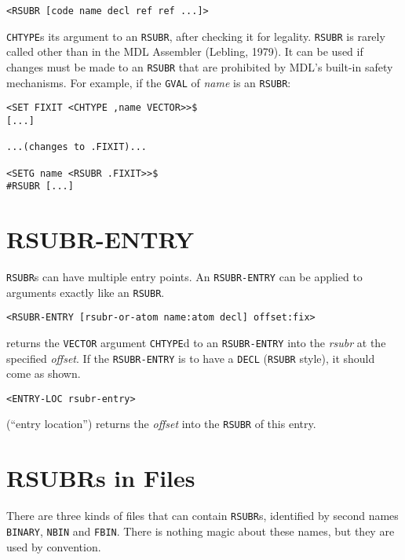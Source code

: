 \documentclass[a4paper]{scrbook}
\begin{document}
\begin{verbatim}
<RSUBR [code name decl ref ref ...]>
\end{verbatim}

 \texttt{CHTYPE}s its argument to an \texttt{RSUBR}, after checking it for legality.
\texttt{RSUBR} is rarely called other than in the MDL Assembler (Lebling, 1979). It can be used if changes must be made to
an \texttt{RSUBR} that are prohibited by MDL's built-in safety mechanisms. For example, if the \texttt{GVAL} of \emph{name}
is an \texttt{RSUBR}:

\begin{verbatim}
<SET FIXIT <CHTYPE ,name VECTOR>>$
[...]

...(changes to .FIXIT)...

<SETG name <RSUBR .FIXIT>>$
#RSUBR [...]
\end{verbatim}

\section{RSUBR-ENTRY}\label{rsubr-entry}

\texttt{RSUBR}s can have multiple entry points. An \texttt{RSUBR-ENTRY} can be applied to arguments exactly like an
\texttt{RSUBR}.

\begin{verbatim}
<RSUBR-ENTRY [rsubr-or-atom name:atom decl] offset:fix>
\end{verbatim}

 returns the \texttt{VECTOR} argument \texttt{CHTYPE}d to an \texttt{RSUBR-ENTRY} into
the \emph{rsubr} at the specified \emph{offset}. If the \texttt{RSUBR-ENTRY} is to have a \texttt{DECL} (\texttt{RSUBR}
style), it should come as shown.

\begin{verbatim}
<ENTRY-LOC rsubr-entry>
\end{verbatim}

 (``entry location'') returns the \emph{offset} into the \texttt{RSUBR} of this entry.

\section{RSUBRs in Files}\label{rsubrs-in-files}

There are three kinds of files that can contain \texttt{RSUBR}s, identified by second names
\texttt{BINARY}, \texttt{NBIN} and
\texttt{FBIN}. There is nothing magic about these names, but they are used by convention.
\end{document}
